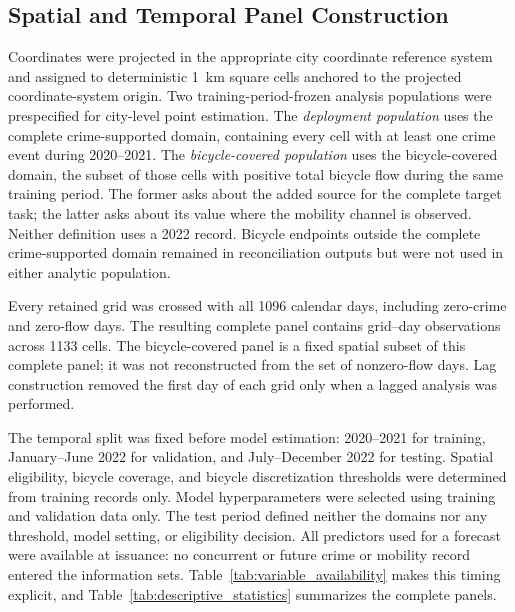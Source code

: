 \subsection{Spatial and Temporal Panel Construction}
\label{subsec:panel_construction}

Coordinates were projected in the appropriate city coordinate reference
system and assigned to deterministic 1~km square cells anchored to the
projected coordinate-system origin. Two training-period-frozen analysis
populations were prespecified for city-level point estimation. The
\emph{deployment population} uses the complete
crime-supported domain, containing every cell with at least one crime event
during 2020--2021. The \emph{bicycle-covered population} uses the
bicycle-covered domain, the subset of those cells with positive total
bicycle flow during the same training period. The former asks about the
added source for the complete target task; the latter asks about its value
where the mobility channel is observed. Neither definition uses a 2022
record. Bicycle endpoints outside the complete crime-supported domain
remained in reconciliation outputs but were not used in either analytic
population.

Every retained grid was crossed with all 1096 calendar days, including
zero-crime and zero-flow days. The resulting complete panel contains
\TotalPanelRows{} grid--day observations across 1133 cells. The
bicycle-covered panel is a fixed spatial subset of this complete panel; it
was not reconstructed from the set of nonzero-flow days. Lag construction
removed the first day of each grid only when a lagged analysis was
performed.

The temporal split was fixed before model estimation: 2020--2021 for
training, January--June 2022 for validation, and July--December 2022 for
testing. Spatial eligibility, bicycle coverage, and bicycle discretization
thresholds were determined from training records only. Model
hyperparameters were selected using training and validation data only.
The test period defined neither the domains nor any threshold, model
setting, or eligibility decision. All predictors used for a forecast were
available at issuance: no concurrent or future crime or mobility record
entered the information sets. Table~\ref{tab:variable_availability} makes
this timing explicit, and Table~\ref{tab:descriptive_statistics} summarizes
the complete panels.




